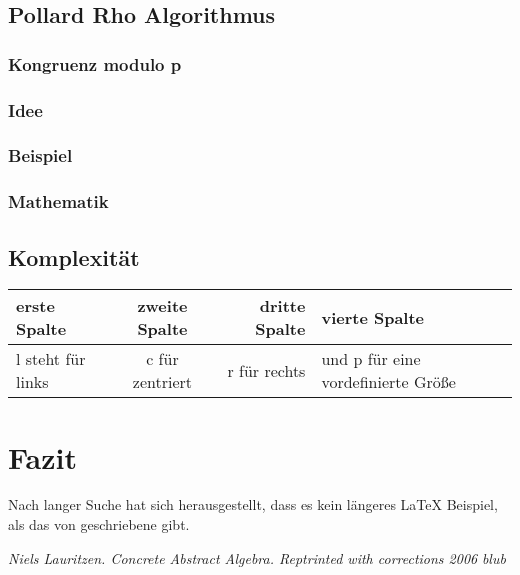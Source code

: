 \documentclass[12pt, a4paper, titlepage,twoside]{article}
\begin{document}
		\subsection{Pollard Rho Algorithmus}
			\subsubsection{Kongruenz modulo p}
			\subsubsection{Idee}
			\subsubsection{Beispiel}
			\subsubsection{Mathematik}
		\subsection{Komplexit\"at}
	
	\begin{tabular}{|l|c|r|p{2cm}|}
		\hline
		erste Spalte & zweite Spalte & dritte Spalte & vierte Spalte \\
		\hline 
		l steht f\"ur links & c f\"ur zentriert & r f\"ur rechts & und p f\"ur 
		eine vordefinierte Gr\"o\ss e \\
		\hline 
	\end{tabular} 
	
	
	\newpage
	\section{Fazit}\label{conclusions}
	Nach langer Suche hat sich herausgestellt, dass es kein l\"angeres
	\LaTeX{} Beispiel, als das von \cite{lau} geschriebene gibt.
	
	
	\newpage
	\begin{thebibliography}{2}
		 \emph{Niels Lauritzen. Concrete Abstract Algebra. Reptrinted with
			corrections 2006}
		 \emph{blub}
	\end{thebibliography}
	
\end{document}
